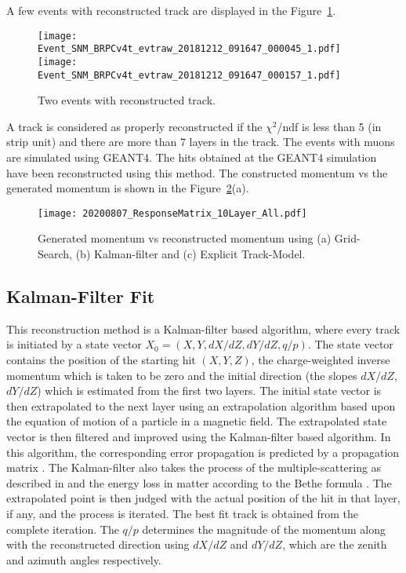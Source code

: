 A few events with reconstructed track are displayed in the
Figure~\ref{fig:eventdisplay}.
\begin{figure}[h]
  \texttt{[image: Event\_SNM\_BRPCv4t\_evtraw\_20181212\_091647\_000045\_1.pdf]}
  \texttt{[image: Event\_SNM\_BRPCv4t\_evtraw\_20181212\_091647\_000157\_1.pdf]}
  \caption{Two events with reconstructed track.}
  \label{fig:eventdisplay}
\end{figure}
A track is considered as properly reconstructed if the $\chi^{2}$/ndf
is less than 5 (in strip unit) and there are more than 7 layers in
the track.
The events with muons are simulated using GEANT4. The hits obtained
at the GEANT4 simulation have been reconstructed using this method.
The constructed momentum vs the generated momentum is shown in the
Figure~\ref{fig:recomom}(a).
\begin{figure}[h]
  \centering
  \texttt{[image: 20200807\_ResponseMatrix\_10Layer\_All.pdf]}
  \caption{Generated momentum vs reconstructed momentum using
    (a) Grid-Search, (b) Kalman-filter and (c) Explicit Track-Model.}
  \label{fig:recomom}
\end{figure}


\subsection{Kalman-Filter Fit}
This reconstruction method is a Kalman-filter based algorithm, where
every track is initiated by a state vector
$X_{0}=\left(X,Y,dX/dZ,dY/dZ,q/p\right)$. The state vector contains
the position of the starting hit $\left(X,Y,Z\right)$,
the charge-weighted inverse momentum which is taken to be zero and
the initial direction (the slopes $dX/dZ$, $dY/dZ$) which is
estimated from the first two layers. The initial state vector is then
extrapolated to the next layer using an extrapolation algorithm based
upon the equation of motion of a particle in a magnetic field. The
extrapolated state vector is then filtered and improved using the
Kalman-filter based algorithm. In this algorithm, the corresponding
error propagation is predicted by a propagation matrix \cite{kalman1}.
The Kalman-filter also takes the process of the multiple-scattering
as described in \cite{kalman2} and the energy loss in matter according
to the Bethe formula \cite{bethe1}. The extrapolated point is then
judged with the actual position of the hit in that layer, if any, and
the process is iterated. The best fit track is obtained from the
complete iteration. The $q/p$ determines the magnitude of the momentum
along with the reconstructed direction using $dX/dZ$ and $dY/dZ$, which
are the zenith and azimuth angles respectively.

